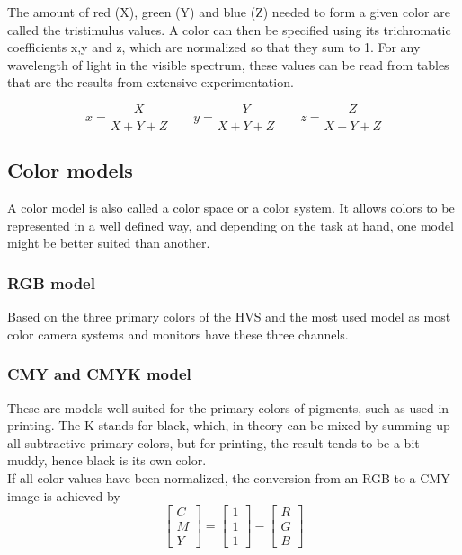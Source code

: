 The amount of red (X), green (Y) and blue (Z) needed to form a given color are called the tristimulus values.
A color can then be specified using its trichromatic coefficients x,y and z, which are normalized so that they sum to 1.
For any wavelength of light in the visible spectrum, these values can be read from tables that are the results from extensive experimentation.

\[
	x = \frac{X}{X+Y+Z} \qquad
	y = \frac{Y}{X+Y+Z} \qquad
	z = \frac{Z}{X+Y+Z}
\]



\subsection{Color models }
A color model is also called a color space or a color system. It allows colors to be represented in a well defined way, and depending on the task at hand, one model might be better suited than another.

\subsubsection{RGB model }
Based on the three primary colors of the HVS and the most used model as most color camera systems and monitors have these three channels.


\subsubsection{CMY and CMYK model }
These are models well suited for the primary colors of pigments, such as used in printing. The K stands for black, which, in theory can be mixed by summing up all subtractive primary colors, but for printing, the result tends to be a bit muddy, hence black is its own color. \\

If all color values have been normalized, the conversion from an RGB to a CMY image is achieved by
\begin{equation}
	\left[ \begin{array}{l} C \\ M \\ Y \end{array} \right] = \left[ \begin{array}{l} 1 \\ 1 \\ 1 \end{array} \right] - \left[ \begin{array}{l} R \\ G \\ B \end{array} \right]
\end{equation}


